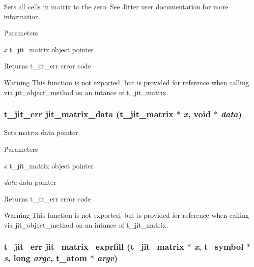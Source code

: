 Sets all cells in matrix to the zero. See Jitter user documentation for more information.


\begin{DoxyParams}{Parameters}
\item[{\em x}]t\_\-jit\_\-matrix object pointer\end{DoxyParams}
\begin{DoxyReturn}{Returns}
t\_\-jit\_\-err error code
\end{DoxyReturn}
\begin{DoxyWarning}{Warning}
This function is not exported, but is provided for reference when calling via jit\_\-object\_\-method on an intance of t\_\-jit\_\-matrix. 
\end{DoxyWarning}
\hypertarget{group__matrixmod_ga2c46ae2df38dcc4be2166c05710ef42a}{
\subsubsection[{jit\_\-matrix\_\-data}]{\setlength{\rightskip}{0pt plus 5cm}t\_\-jit\_\-err jit\_\-matrix\_\-data (t\_\-jit\_\-matrix $\ast$ {\em x}, \/  void $\ast$ {\em data})}}
\label{group__matrixmod_ga2c46ae2df38dcc4be2166c05710ef42a}


Sets matrix data pointer. 
\begin{DoxyParams}{Parameters}
\item[{\em x}]t\_\-jit\_\-matrix object pointer \item[{\em data}]data pointer\end{DoxyParams}
\begin{DoxyReturn}{Returns}
t\_\-jit\_\-err error code
\end{DoxyReturn}
\begin{DoxyWarning}{Warning}
This function is not exported, but is provided for reference when calling via jit\_\-object\_\-method on an intance of t\_\-jit\_\-matrix. 
\end{DoxyWarning}
\hypertarget{group__matrixmod_ga85d4a4256d423c720489526a56803396}{
\subsubsection[{jit\_\-matrix\_\-exprfill}]{\setlength{\rightskip}{0pt plus 5cm}t\_\-jit\_\-err jit\_\-matrix\_\-exprfill (t\_\-jit\_\-matrix $\ast$ {\em x}, \/  {\bf t\_\-symbol} $\ast$ {\em s}, \/  long {\em argc}, \/  {\bf t\_\-atom} $\ast$ {\em argv})}}
\label{group__matrixmod_ga85d4a4256d423c720489526a56803396}


